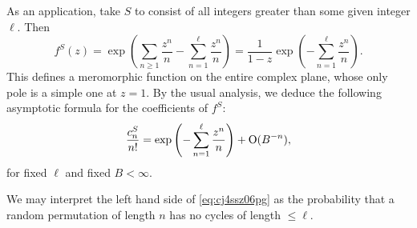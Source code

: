 \documentclass[reqno]{amsart}  \numberwithin{theorem}{section} \numberwithin{equation}{section}
\begin{document}
As an application, take $S$ to consist of all integers greater than some given integer $\ell$.  Then
\begin{equation*}
  f^S(z) = \exp \left(  \sum_{n \geq 1} \frac{z^n}{ n } - \sum_{n = 1}^{\ell} \frac{z^n }{n}\right)
  =
  \frac{1}{1 - z} \exp \left( - \sum_{n = 1}^{\ell} \frac{z^n }{n} \right).
\end{equation*}
This defines a meromorphic function on the entire complex plane, whose only pole is a simple one at $z = 1$.  By the usual analysis, we deduce the following asymptotic formula for the coefficients of $f^S$:
\begin{equation}\label{eq:cj4ssz06pg}
  \frac{c_n^S}{n!} = \exp \left( - \sum_{n = 1 }^{\ell} \frac{z^n }{n} \right) + \operatorname{O}(B^{-n}),
\end{equation}
for fixed $\ell$ and fixed $B < \infty$.

We may interpret the left hand side of \eqref{eq:cj4ssz06pg} as the probability that a random permutation of length $n$ has no cycles of length $\leq \ell$.
\end{document}
